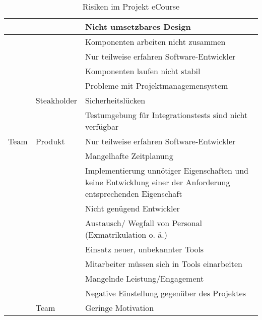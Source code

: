 \begin{table}
\begin{tabularx}{\textwidth}{|l|l|X|}
\hline
 &  & Nicht umsetzbares Design  \\ 
\hline
 &  & Komponenten arbeiten nicht zusammen\\ 
\hline
 &  & Nur teilweise erfahren Software-Entwickler  \\ 
\hline
 &  & Komponenten laufen nicht stabil  \\ 
\hline
 &  & Probleme mit Projektmanagemensystem \\ 
\hline
 & Steakholder & Sicherheitslücken\\ 
\hline
 &  & Testumgebung für Integrationstests sind nicht verfügbar  \\ 
\hline
Team & Produkt & Nur teilweise erfahren Software-Entwickler  \\ 
\hline
 &  & Mangelhafte Zeitplanung   \\ 
\hline
 &  & Implementierung unnötiger Eigenschaften und keine Entwicklung einer der Anforderung entsprechenden Eigenschaft  \\ 
\hline
 &  & Nicht genügend Entwickler  \\ 
\hline
 &  & Austausch/ Wegfall von Personal (Exmatrikulation o. ä.)   \\ 
\hline
 &  & Einsatz neuer, unbekannter Tools  \\ 
\hline
 &  & Mitarbeiter müssen sich in Tools einarbeiten  \\ 
\hline
 &  & Mangelnde Leistung/Engagement  \\ 
\hline
 &  & Negative Einstellung gegenüber des Projektes  \\ 
\hline
 & Team & Geringe Motivation\\ 
\hline
\end{tabularx}
\caption{Risiken im Projekt eCourse}
\label{tab:Risiken}
\end{table}